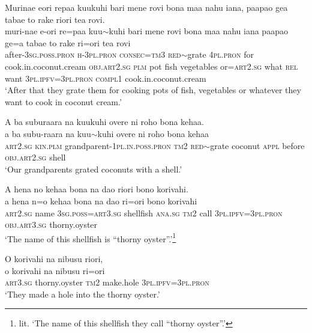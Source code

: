 \ea\label{ex:text01-74}
Murinae eori repaa kuukuhi bari mene rovi bona maa nahu iana, paapao gea tabae to rake riori tea rovi.\\
\gll muri-nae	e-ori	re=paa	kuu{$\sim$}kuhi	bari	mene	rovi	bona	maa	nahu	iana	paapao	ge=a	tabae	to	rake	ri=ori	tea	rovi\\
     after-3\textsc{sg}.\textsc{poss}.\textsc{pron}	\textsc{h}-3\textsc{pl}.\textsc{pron}	\textsc{consec}=\textsc{tm}3	\textsc{red}{$\sim$}grate	4\textsc{pl}.\textsc{pron}	for	cook.in.coconut.cream	\textsc{obj}.\textsc{art}2.\textsc{sg}	\textsc{plm}	pot	fish	vegetables	or=\textsc{art}2.\textsc{sg}	what	\textsc{rel}	want	3\textsc{pl}.\textsc{ipfv}=3\textsc{pl}.\textsc{pron}	\textsc{compl}1	cook.in.coconut.cream\\
\glt `After that they grate them for cooking pots of fish, vegetables or whatever they want to cook in coconut cream.'
\z

\ea\label{ex:text01-75}
A ba suburaara na kuukuhi overe ni roho bona kehaa.\\
\gll a	ba	subu-raara	na	kuu{$\sim$}kuhi	overe	ni	roho	bona	kehaa\\
     \textsc{art}2.\textsc{sg}	\textsc{kin}.\textsc{plm}	grandparent-1\textsc{pl}.\textsc{in}.\textsc{poss}.\textsc{pron}	\textsc{tm}2	\textsc{red}{$\sim$}grate	coconut	\textsc{appl}	before	\textsc{obj}.\textsc{art}2.\textsc{sg}	shell\\
\glt `Our grandparents grated coconuts with a shell.'
\z

\ea\label{ex:text01-76}
A hena no kehaa bona na dao riori bono korivahi.\\
\gll a	hena	n=o	kehaa	bona	na	dao	ri=ori	bono	korivahi\\
     \textsc{art}2.\textsc{sg}	name	3\textsc{sg}.\textsc{poss}=\textsc{art}3.\textsc{sg}	shellfish	\textsc{ana}.\textsc{sg}	\textsc{tm}2	call	3\textsc{pl}.\textsc{ipfv}=3\textsc{pl}.\textsc{pron}	\textsc{obj}.\textsc{art}3.\textsc{sg}	thorny.oyster\\
\glt `The name of this shellfish is ``thorny oyster''.'\footnote{lit. `The name of this shellfish they call ``thorny oyster''.'}
\z

\ea\label{ex:text01-77}
O korivahi na nibusu riori,\\
\gll o	korivahi	na	nibusu	ri=ori\\
     \textsc{art}3.\textsc{sg}	thorny.oyster	\textsc{tm}2	make.hole	3\textsc{pl}.\textsc{ipfv}=3\textsc{pl}.\textsc{pron}\\
\glt `They made a hole into the thorny oyster.'
\z

